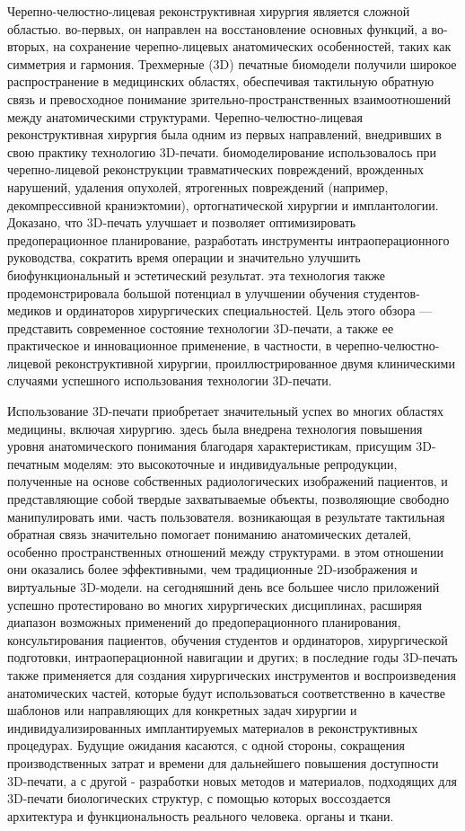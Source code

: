 Черепно-челюстно-лицевая реконструктивная хирургия является сложной областью.
во-первых, он направлен на восстановление основных функций, а во-вторых, на
сохранение черепно-лицевых анатомических особенностей, таких как симметрия и
гармония. Трехмерные (3D) печатные биомодели получили широкое распространение в
медицинских областях, обеспечивая тактильную обратную связь и превосходное
понимание зрительно-пространственных взаимоотношений между анатомическими
структурами. Черепно-челюстно-лицевая реконструктивная хирургия была одним из
первых направлений, внедривших в свою практику технологию 3D-печати.
биомоделирование использовалось при черепно-лицевой реконструкции травматических
повреждений, врожденных нарушений, удаления опухолей, ятрогенных повреждений
(например, декомпрессивной краниэктомии), ортогнатической хирургии и
имплантологии. Доказано, что 3D-печать улучшает и позволяет оптимизировать
предоперационное планирование, разработать инструменты интраоперационного
руководства, сократить время операции и значительно улучшить биофункциональный и
эстетический результат. эта технология также продемонстрировала большой
потенциал в улучшении обучения студентов-медиков и ординаторов хирургических
специальностей. Цель этого обзора — представить современное состояние технологии
3D-печати, а также ее практическое и инновационное применение, в частности, в
черепно-челюстно-лицевой реконструктивной хирургии, проиллюстрированное двумя
клиническими случаями успешного использования технологии 3D-печати.\cite{28523082}

Использование 3D-печати приобретает значительный успех во многих областях
медицины, включая хирургию. здесь была внедрена технология повышения уровня
анатомического понимания благодаря характеристикам, присущим 3D-печатным
моделям: это высокоточные и индивидуальные репродукции, полученные на основе
собственных радиологических изображений пациентов, и представляющие собой
твердые захватываемые объекты, позволяющие свободно манипулировать ими. часть
пользователя. возникающая в результате тактильная обратная связь значительно
помогает пониманию анатомических деталей, особенно пространственных отношений
между структурами. в этом отношении они оказались более эффективными, чем
традиционные 2D-изображения и виртуальные 3D-модели. на сегодняшний день все
большее число приложений успешно протестировано во многих хирургических
дисциплинах, расширяя диапазон возможных применений до предоперационного
планирования, консультирования пациентов, обучения студентов и ординаторов,
хирургической подготовки, интраоперационной навигации и других; в последние годы
3D-печать также применяется для создания хирургических инструментов и
воспроизведения анатомических частей, которые будут использоваться
соответственно в качестве шаблонов или направляющих для конкретных задач
хирургии и индивидуализированных имплантируемых материалов в реконструктивных
процедурах. Будущие ожидания касаются, с одной стороны, сокращения
производственных затрат и времени для дальнейшего повышения доступности
3D-печати, а с другой - разработки новых методов и материалов, подходящих для
3D-печати биологических структур, с помощью которых воссоздается архитектура и
функциональность реального человека. органы и ткани.\cite{30167991}
